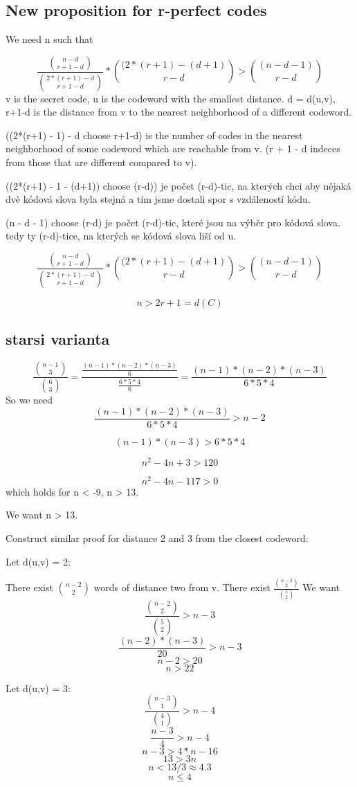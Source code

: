 \subsection{New proposition for r-perfect codes}
We need n such that 

\[ \frac{\binom{n-d}{r+1-d}}{\binom{2*(r+1) - d}{r + 1 - d}} * \binom{(2*(r+1) - (d+1)}{r-d} > \binom{(n - d - 1)}{r-d} \]
v is the secret code, u is the codeword with the smallest distance. 
d = d(u,v), r+1-d is the distance from v to the nearest neighborhood of a different codeword. 

((2*(r+1) - 1) - d choose r+1-d) is the number of codes in the nearest neighborhood of some codeword which are reachable from v. (r + 1 - d indeces from those that are different compared to v). 

((2*(r+1) - 1 - (d+1)) choose (r-d)) je počet (r-d)-tic, na kterých chci aby nějaká dvě kódová slova byla stejná a tím jsme dostali spor s vzdáleností kódu. 

(n - d - 1) choose (r-d) je počet (r-d)-tic, které jsou na výběr pro kódová slova. tedy ty (r-d)-tice, na kterých se kódová slova liší od u. 

\[ \frac{\binom{n-d}{r+1-d}}{\binom{2*(r+1) - d}{r + 1 - d}} * \binom{(2*(r+1) - (d+1)}{r-d} > \binom{(n - d - 1)}{r-d} \]

\[n > 2r +1 = d(C)\]

\subsection{starsi varianta}
\[
\frac{\binom{n-1}{3}}{\binom{6}{3}} = \frac{\frac{(n-1)*(n-2)*(n-3)}{6}}{\frac{6*5*4}{6}} = \frac{(n-1)*(n-2)*(n-3)}{6*5*4}
\]
So we need 
\[
\frac{(n-1)*(n-2)*(n-3)}{6*5*4} > n-2
\]

\[(n-1)*(n-3) > 6*5*4\]

\[
n^2-4n+3 > 120
\]

\[
n^2-4n-117 > 0
\]
which holds for n < -9, n > 13. 

We want n > 13. 

Construct similar proof for distance 2 and 3 from the closest codeword:

Let d(u,v) = 2:

There exist $\binom{n-2}{2}$ words of distance two from v. There exist $\frac{\binom{n-2}{2}}{\binom{5}{2}}$
We want 
\[
\frac{\binom{n-2}{2}}{\binom{5}{2}} > n-3
\]
\[\frac{(n-2)*(n-3)}{20} > n-3\]
\[n-2 > 20\]
\[n > 22\]

Let d(u,v) = 3:
\[\frac{\binom{n-3}{1}}{\binom{4}{1}} > n-4\]
\[\frac{n-3}{4} > n-4\]
\[n-3 > 4*n-16\]
\[13 > 3n\]
\[n < 13/3 \approx 4.3\]
\[n \leq 4\]

